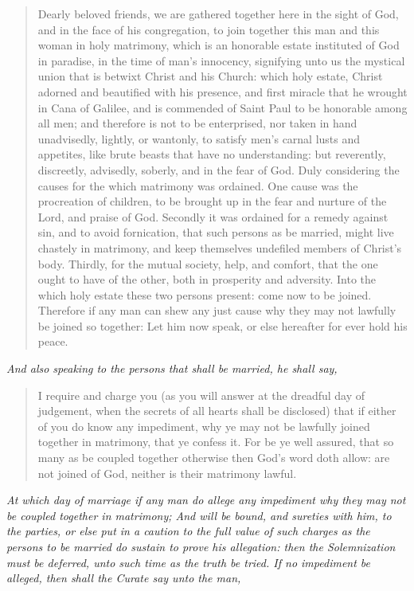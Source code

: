 \documentclass[
]{book}
\begin{document}
\begin{quote}
Dearly beloved friends, we are gathered together here in the sight of God, and in the face of his congregation, to join together this man and this woman in holy matrimony, which is an honorable estate instituted of God in paradise, in the time of man's innocency, signifying unto us the mystical union that is betwixt Christ and his Church: which holy estate, Christ adorned and beautified with his presence, and first miracle that he wrought in Cana of Galilee, and is commended of Saint Paul to be honorable among all men; and therefore is not to be enterprised, nor taken in hand unadvisedly, lightly, or wantonly, to satisfy men's carnal lusts and appetites, like brute beasts that have no understanding: but reverently, discreetly, advisedly, soberly, and in the fear of God. Duly considering the causes for the which matrimony was ordained. One cause was the procreation of children, to be brought up in the fear and nurture of the Lord, and praise of God. Secondly it was ordained for a remedy against sin, and to avoid fornication, that such persons as be married, might live chastely in matrimony, and keep themselves undefiled members of Christ's body. Thirdly, for the mutual society, help, and comfort, that the one ought to have of the other, both in prosperity and adversity. Into the which holy estate these two persons present: come now to be joined. Therefore if any man can shew any just cause why they may not lawfully be joined so together: Let him now speak, or else hereafter for ever hold his peace.
\end{quote}

\begin{center}
\emph{And also speaking to the persons that shall be married, he shall say,}

\end{center}

\begin{quote}
I require and charge you (as you will answer at the dreadful day of judgement, when the secrets of all hearts shall be disclosed) that if either of you do know any impediment, why ye may not be lawfully joined together in matrimony, that ye confess it. For be ye well assured, that so many as be coupled together otherwise then God's word doth allow: are not joined of God, neither is their matrimony lawful.
\end{quote}

\begin{center}
\emph{At which day of marriage if any man do allege any impediment why they may not be coupled together in matrimony; And will be bound, and sureties with him, to the parties, or else put in a caution to the full value of such charges as the persons to be married do sustain to prove his allegation: then the Solemnization must be deferred, unto such time as the truth be tried. If no impediment be alleged, then shall the Curate say unto the man,}

\end{center}
\end{document}
